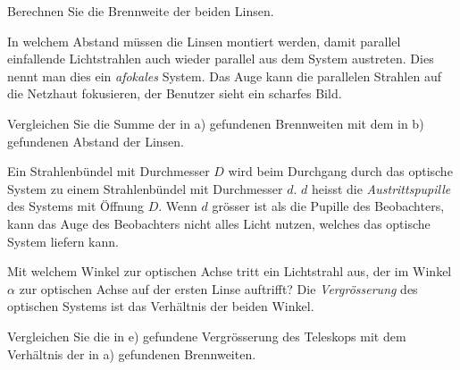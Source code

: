 \begin{teilaufgaben}
\item
Berechnen Sie die Brennweite der beiden Linsen.
\item
In welchem Abstand müssen die Linsen montiert werden, damit parallel
einfallende Lichtstrahlen auch wieder parallel aus dem System
austreten.
Dies nennt man dies ein {\em afokales} System.
Das Auge kann die parallelen Strahlen auf die Netzhaut fokusieren,
der Benutzer sieht ein scharfes Bild.
\item
Vergleichen Sie die Summe der in a) gefundenen Brennweiten mit dem
in b) gefundenen Abstand der Linsen.
\item
Ein Strahlenbündel mit Durchmesser $D$ wird beim Durchgang durch das
optische System zu einem Strahlenbündel mit Durchmesser $d$.
$d$ heisst die {\em Austrittspupille} des Systems mit Öffnung $D$.
Wenn $d$ grösser ist als die Pupille des Beobachters, kann das Auge des
Beobachters nicht alles Licht nutzen, welches das optische System liefern
kann.
\item
Mit welchem Winkel zur optischen Achse tritt ein Lichtstrahl aus,
der im Winkel $\alpha$ zur optischen Achse auf der ersten Linse
auftrifft?
Die {\em Vergrösserung} des optischen Systems ist das Verhältnis der
beiden Winkel.
\item
Vergleichen Sie die in e) gefundene Vergrösserung des Teleskops
mit dem Verhältnis der in a) gefundenen Brennweiten.
\end{teilaufgaben}


